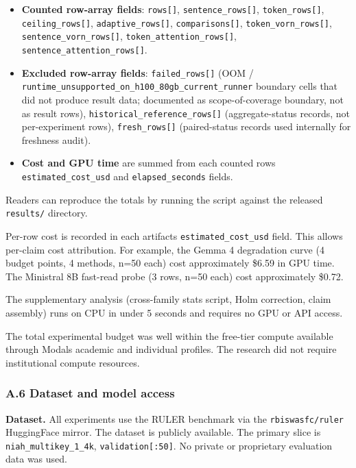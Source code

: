 \documentclass[
]{article}
\providecommand{\tightlist}{%
  \setlength{\itemsep}{0pt}\setlength{\parskip}{0pt}}
\begin{document}
\begin{itemize}
\tightlist
\item
  \textbf{Counted row-array fields}: \texttt{rows{[}{]}},
  \texttt{sentence\_rows{[}{]}}, \texttt{token\_rows{[}{]}},
  \texttt{ceiling\_rows{[}{]}}, \texttt{adaptive\_rows{[}{]}},
  \texttt{comparisons{[}{]}}, \texttt{token\_vorn\_rows{[}{]}},
  \texttt{sentence\_vorn\_rows{[}{]}},
  \texttt{token\_attention\_rows{[}{]}},
  \texttt{sentence\_attention\_rows{[}{]}}.
\item
  \textbf{Excluded row-array fields}: \texttt{failed\_rows{[}{]}} (OOM /
  \texttt{runtime\_unsupported\_\allowbreak{}on\_h100\_\allowbreak{}80gb\_\allowbreak{}current\_runner}
  boundary cells that did not produce result data; documented as
  scope-of-coverage boundary, not as result rows),
  \texttt{historical\_reference\_rows{[}{]}} (aggregate-status records,
  not per-experiment rows), \texttt{fresh\_rows{[}{]}} (paired-status
  records used internally for freshness audit).
\item
  \textbf{Cost and GPU time} are summed from each counted
  row\textquotesingle s \texttt{estimated\_cost\_usd} and
  \texttt{elapsed\_seconds} fields.
\end{itemize}

Readers can reproduce the totals by running the script against the
released \texttt{results/} directory.

Per-row cost is recorded in each artifact\textquotesingle s
\texttt{estimated\_cost\_usd} field. This allows per-claim cost
attribution. For example, the Gemma 4 degradation curve (4 budget
points, 4 methods, n=50 each) cost approximately \$6.59 in GPU time. The
Ministral 8B fast-read probe (3 rows, n=50 each) cost approximately
\$0.72.

The supplementary analysis (cross-family stats script, Holm correction,
claim assembly) runs on CPU in under 5 seconds and requires no GPU or
API access.

The total experimental budget was well within the free-tier compute
available through Modal\textquotesingle s academic and individual
profiles. The research did not require institutional compute resources.

\subsubsection{A.6 Dataset and model
access}\label{a6-dataset-and-model-access}

\textbf{Dataset.} All experiments use the RULER benchmark via the
\texttt{rbiswasfc/ruler} HuggingFace mirror. The dataset is publicly
available. The primary slice is \texttt{niah\_multikey\_1\_4k},
\texttt{validation{[}:50{]}}. No private or proprietary evaluation data
was used.
\end{document}
